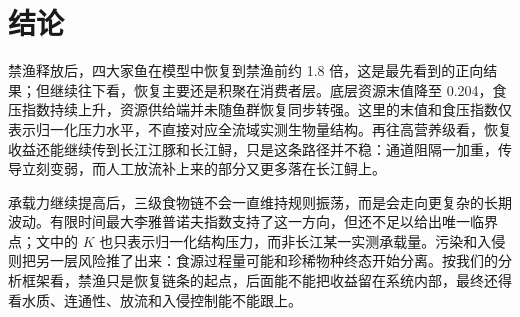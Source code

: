 \section{结论}
禁渔释放后，四大家鱼在模型中恢复到禁渔前约 1.8 倍，这是最先看到的正向结果；但继续往下看，恢复主要还是积聚在消费者层。底层资源末值降至 0.204，食压指数持续上升，资源供给端并未随鱼群恢复同步转强。这里的末值和食压指数仅表示归一化压力水平，不直接对应全流域实测生物量结构。再往高营养级看，恢复收益还能继续传到长江江豚和长江鲟，只是这条路径并不稳：通道阻隔一加重，传导立刻变弱，而人工放流补上来的部分又更多落在长江鲟上。

承载力继续提高后，三级食物链不会一直维持规则振荡，而是会走向更复杂的长期波动。有限时间最大李雅普诺夫指数支持了这一方向，但还不足以给出唯一临界点；文中的 $K$ 也只表示归一化结构压力，而非长江某一实测承载量。污染和入侵则把另一层风险推了出来：食源过程量可能和珍稀物种终态开始分离。按我们的分析框架看，禁渔只是恢复链条的起点，后面能不能把收益留在系统内部，最终还得看水质、连通性、放流和入侵控制能不能跟上。

